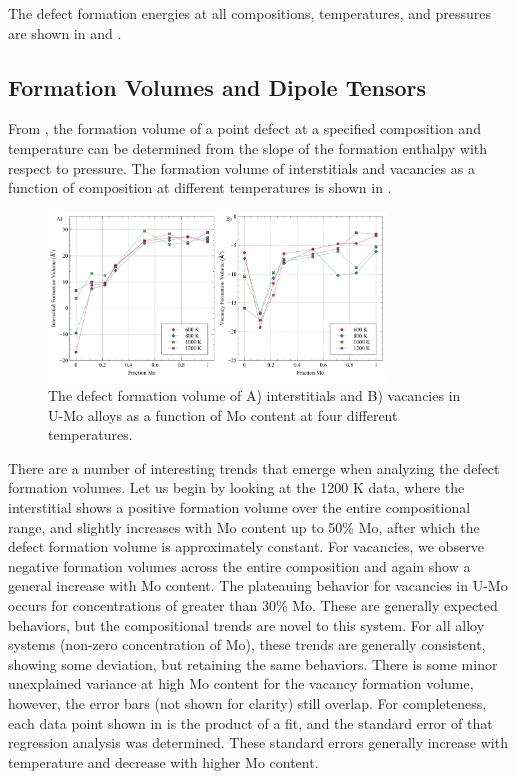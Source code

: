 \documentclass[review]{elsarticle}
\begin{document}
The defect formation energies at all compositions, temperatures, and pressures are shown in  and . 

\subsection{Formation Volumes and Dipole Tensors}

From , the formation volume of a point defect at a specified composition and temperature can be determined from the slope of the formation enthalpy with respect to pressure. The formation volume of interstitials and vacancies as a function of composition at different temperatures is shown in .

\begin{figure}[h!]
    \centering
    \includegraphics[width=0.8\textwidth]{form_vol.pdf}
    \caption{The defect formation volume of A) interstitials and B) vacancies in U-Mo alloys as a function of Mo content at four different temperatures.}
    \label{fig:form_vol}
\end{figure}

There are a number of interesting trends that emerge when analyzing the defect formation volumes. Let us begin by looking at the 1200 K data, where the interstitial shows a positive formation volume over the entire compositional range, and slightly increases with Mo content up to 50\% Mo, after which the defect formation volume is approximately constant. For vacancies, we observe negative formation volumes across the entire composition and again show a general increase with Mo content. The plateauing behavior for vacancies in U-Mo occurs for concentrations of greater than 30\% Mo. These are generally expected behaviors, but the compositional trends are novel to this system. For all alloy systems (non-zero concentration of Mo), these trends are generally consistent, showing some deviation, but retaining the same behaviors. There is some minor unexplained variance at high Mo content for the vacancy formation volume, however, the error bars (not shown for clarity) still overlap. For completeness, each data point shown in  is the product of a fit, and the standard error of that regression analysis was determined. These standard errors generally increase with temperature and decrease with higher Mo content. 
\end{document}
